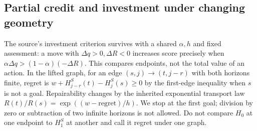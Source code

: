 \documentclass[11pt]{article}
\theoremstyle{definition}\newtheorem{definition}[theorem]{Definition}\newtheorem{conjecture}[theorem]{Conjecture}\newtheorem{example}[theorem]{Example}
\begin{document}
\subsection{Partial credit and investment under changing geometry}
The source's investment criterion survives with a shared $\alpha,h$ and fixed assessment: a move with $\Delta q>0,\Delta R<0$ increases score precisely when $\alpha\Delta q>(1-\alpha)(-\Delta R)$. This compares endpoints, not the total value of an action. In the lifted graph, for an edge $(s,j)\to(t,j-r)$ with both horizons finite, regret is $w+H_{j-r}^S(t)-H_j^S(s)\ge0$ by the first-edge inequality when $s$ is not a goal. Repairability changes by the inherited exponential transport law $R(t)/R(s)=\exp((w-\mathrm{regret})/h)$. We stop at the first goal; division by zero or subtraction of two infinite horizons is not allowed. Do not compare $H_0$ at one endpoint to $H_1^S$ at another and call it regret under one graph.
\end{document}
